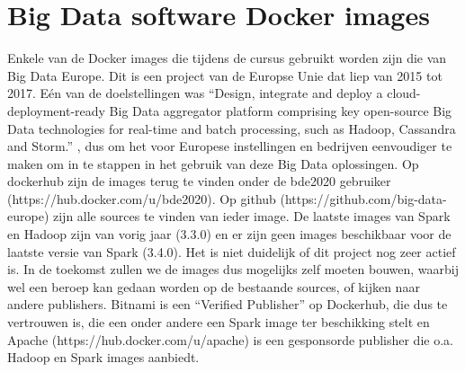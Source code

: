 \section{Big Data software Docker images}
Enkele van de Docker images die tijdens de cursus gebruikt worden zijn die van Big Data Europe. Dit is een project van de Europse Unie dat liep van 2015 tot 2017.
Eén van de doelstellingen was ``Design, integrate and deploy a cloud-deployment-ready Big Data aggregator platform comprising key open-source Big Data technologies for real-time and batch processing, such as Hadoop, Cassandra and Storm.'' \textcite{Commission2022}, dus om het voor Europese instellingen en bedrijven eenvoudiger te maken om in te stappen in het gebruik van deze Big Data oplossingen.
\newline
\sloppypar Op dockerhub zijn de images terug te vinden onder de bde2020 gebruiker (https://hub.docker.com/u/bde2020). Op github (https://github.com/big-data-europe) zijn alle sources te vinden van ieder image.
\newline
De laatste images van Spark en Hadoop zijn van vorig jaar (3.3.0) en er zijn geen images beschikbaar voor de laatste versie van Spark (3.4.0). Het is niet duidelijk of dit project nog zeer actief is. In de toekomst zullen we de images dus mogelijks zelf moeten bouwen, waarbij wel een beroep kan gedaan worden op de bestaande sources, of kijken naar andere publishers.
\newline
\sloppypar Bitnami is een ``Verified Publisher'' op Dockerhub, die dus te vertrouwen is, die een onder andere een Spark image ter beschikking stelt en Apache (https://hub.docker.com/u/apache) is een gesponsorde publisher die o.a. Hadoop en Spark images aanbiedt.



